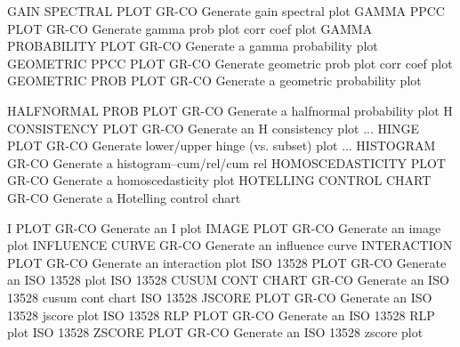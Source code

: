GAIN SPECTRAL PLOT          GR-CO Generate gain spectral plot
GAMMA PPCC PLOT             GR-CO Generate gamma prob plot corr coef plot
GAMMA PROBABILITY PLOT      GR-CO Generate a gamma probability plot
GEOMETRIC PPCC PLOT         GR-CO Generate geometric prob plot corr coef plot
GEOMETRIC PROB PLOT         GR-CO Generate a geometric probability plot

HALFNORMAL PROB PLOT        GR-CO Generate a halfnormal probability plot
H CONSISTENCY PLOT          GR-CO Generate an H consistency plot
... HINGE PLOT              GR-CO Generate lower/upper hinge (vs. subset) plot
... HISTOGRAM               GR-CO Generate a histogram--cum/rel/cum rel
HOMOSCEDASTICITY PLOT       GR-CO Generate a homoscedasticity plot
HOTELLING CONTROL CHART     GR-CO Generate a Hotelling control chart

I PLOT                      GR-CO Generate an I plot
IMAGE PLOT                  GR-CO Generate an image plot
INFLUENCE CURVE             GR-CO Generate an influence curve
INTERACTION PLOT            GR-CO Generate an interaction plot
ISO 13528 PLOT              GR-CO Generate an ISO 13528 plot
ISO 13528 CUSUM CONT CHART  GR-CO Generate an ISO 13528 cusum cont chart
ISO 13528 JSCORE PLOT       GR-CO Generate an ISO 13528 jscore plot
ISO 13528 RLP PLOT          GR-CO Generate an ISO 13528 RLP plot
ISO 13528 ZSCORE PLOT       GR-CO Generate an ISO 13528 zscore plot


